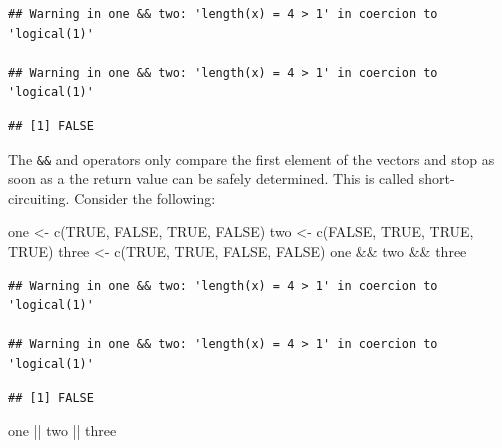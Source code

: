 \documentclass[
]{article}
\newenvironment{Shaded}{\begin{snugshade}}{\end{snugshade}}
\newcommand{\ConstantTok}[1]{\textcolor[rgb]{0.00,0.00,0.00}{#1}}
\newcommand{\FunctionTok}[1]{\textcolor[rgb]{0.00,0.00,0.00}{#1}}
\newcommand{\NormalTok}[1]{#1}
\newcommand{\OtherTok}[1]{\textcolor[rgb]{0.56,0.35,0.01}{#1}}
\newcommand{\SpecialCharTok}[1]{\textcolor[rgb]{0.00,0.00,0.00}{#1}}
\begin{document}
\begin{verbatim}
## Warning in one && two: 'length(x) = 4 > 1' in coercion to 'logical(1)'

## Warning in one && two: 'length(x) = 4 > 1' in coercion to 'logical(1)'
\end{verbatim}

\begin{verbatim}
## [1] FALSE
\end{verbatim}

The \texttt{\&\&} and \texttt{\textbar{}\textbar{}} operators only compare the first element of the vectors and stop as soon as a the return
value can be safely determined. This is called short-circuiting. Consider the following:

\begin{Shaded}
\begin{Highlighting}[]
\NormalTok{one }\OtherTok{\textless{}{-}} \FunctionTok{c}\NormalTok{(}\ConstantTok{TRUE}\NormalTok{, }\ConstantTok{FALSE}\NormalTok{, }\ConstantTok{TRUE}\NormalTok{, }\ConstantTok{FALSE}\NormalTok{)}
\NormalTok{two }\OtherTok{\textless{}{-}} \FunctionTok{c}\NormalTok{(}\ConstantTok{FALSE}\NormalTok{, }\ConstantTok{TRUE}\NormalTok{, }\ConstantTok{TRUE}\NormalTok{, }\ConstantTok{TRUE}\NormalTok{)}
\NormalTok{three }\OtherTok{\textless{}{-}} \FunctionTok{c}\NormalTok{(}\ConstantTok{TRUE}\NormalTok{, }\ConstantTok{TRUE}\NormalTok{, }\ConstantTok{FALSE}\NormalTok{, }\ConstantTok{FALSE}\NormalTok{)}
\NormalTok{one }\SpecialCharTok{\&\&}\NormalTok{ two }\SpecialCharTok{\&\&}\NormalTok{ three}
\end{Highlighting}
\end{Shaded}

\begin{verbatim}
## Warning in one && two: 'length(x) = 4 > 1' in coercion to 'logical(1)'

## Warning in one && two: 'length(x) = 4 > 1' in coercion to 'logical(1)'
\end{verbatim}

\begin{verbatim}
## [1] FALSE
\end{verbatim}

\begin{Shaded}
\begin{Highlighting}[]
\NormalTok{one }\SpecialCharTok{||}\NormalTok{ two }\SpecialCharTok{||}\NormalTok{ three}
\end{Highlighting}
\end{Shaded}
\end{document}
